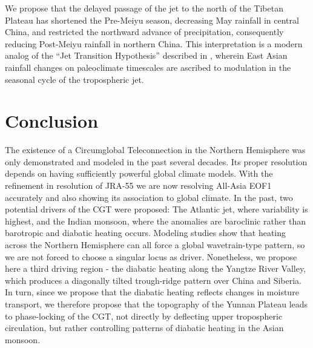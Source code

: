 	 	 
	We propose that the delayed passage of the jet to the north of the Tibetan Plateau has shortened the Pre-Meiyu season, decreasing May rainfall in central China, and restricted the northward advance of precipitation, consequently reducing Post-Meiyu rainfall in northern China. This interpretation is a modern analog of the ``Jet Transition Hypothesis'' described in \citet{Chiang2015}, wherein East Asian rainfall changes on paleoclimate timescales are ascribed to modulation in the seasonal cycle of the tropospheric jet. 	
		 
\section{Conclusion}

	The existence of a Circumglobal Teleconnection in the Northern Hemisphere was only demonstrated and modeled in the past several decades. Its proper resolution depends on having sufficiently powerful global climate models. With the refinement in resolution of JRA-55 we are now resolving All-Asia EOF1 accurately and also showing its association to global climate. In the past, two potential drivers of the CGT were proposed: The Atlantic jet, where variability is highest, and the Indian monsoon, where the anomalies are baroclinic rather than barotropic and diabatic heating occurs. Modeling studies show that heating across the Northern Hemisphere can all force a global wavetrain-type pattern, so we are not forced to choose a singular locus as driver. Nonetheless, we propose here a third driving region - the diabatic heating along the Yangtze River Valley, which produces a diagonally tilted trough-ridge pattern over China and Siberia. In turn, since we propose that the diabatic heating reflects changes in moisture transport, we therefore propose that the topography of the Yunnan Plateau leads to phase-locking of the CGT, not directly by deflecting upper tropospheric circulation, but rather controlling patterns of diabatic heating in the Asian monsoon.
	

